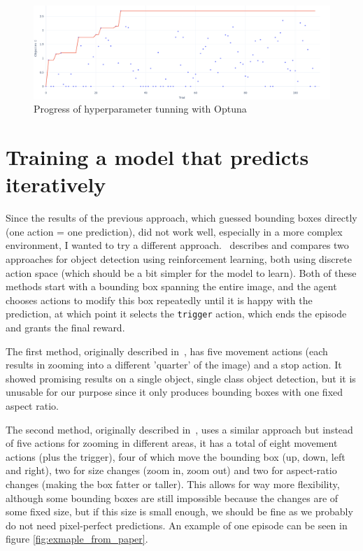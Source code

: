 \documentclass[
  digital,     %
  oneside,     %
  nosansbold,  %
  nocolorbold, %
  lof,         %
  lot,         %
]{fithesis4}
\begin{document}
\begin{figure}
    \centering
    \includegraphics[width=1\linewidth]{diagrams/optuna_progress.png}
    \caption{Progress of hyperparameter tunning with Optuna}
    \label{fig:optuna-progress}
\end{figure}

\chapter{Training a model that predicts iteratively}
\label{ch:iterative}

Since the results of the previous approach, which guessed bounding boxes directly (one action = one prediction), did not work well, especially in a more complex environment, I wanted to try a different approach.~\cite{rl_object_detection} describes and compares two approaches for object detection using reinforcement learning, both using discrete action space (which should be a bit simpler for the model to learn). Both of these methods start with a bounding box spanning the entire image, and the agent chooses actions to modify this box repeatedly until it is happy with the prediction, at which point it selects the \texttt{trigger} action, which ends the episode and grants the final reward.

The first method, originally described in~\cite{hierarchical_od_with_drl}, has five movement actions (each results in zooming into a different 'quarter' of the image) and a stop action. It showed promising results on a single object, single class object detection, but it is unusable for our purpose since it only produces bounding boxes with one fixed aspect ratio.

The second method, originally described in~\cite{iterative_od_with_rl}, uses a similar approach but instead of five actions for zooming in different areas, it has a total of eight movement actions (plus the trigger), four of which move the bounding box (up, down, left and right), two for size changes (zoom in, zoom out) and two for aspect-ratio changes (making the box fatter or taller). This allows for way more flexibility, although some bounding boxes are still impossible because the changes are of some fixed size, but if this size is small enough, we should be fine as we probably do not need pixel-perfect predictions. An example of one episode can be seen in figure \ref{fig:exmaple_from_paper}.
\end{document}
